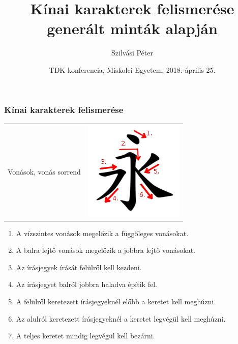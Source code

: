\documentclass{beamer}
\begin{document}

\title[Kínai karakterek felismerése
generált minták alapján]{
{\Large Kínai karakterek felismerése
generált minták alapján}
}
\author[Szilvási Péter]{\Large Szilvási Péter}
\date{TDK konferencia, Miskolci Egyetem, 2018. április 25.}

\frame{\titlepage}

\begin{frame}[fragile]
\frametitle{Kínai karakterek felismerése}

\begin{tabular}{c c}
{\large Vonások, vonás sorrend} & 
\includegraphics[scale=0.3, center]{vonasrend_ordered}
\end{tabular}

\begin{enumerate}
\item A vízszintes vonások megelőzik a függőleges vonásokat.
\item A balra lejtő vonások megelőzik a jobbra lejtő vonásokat.
\item Az írásjegyek írását felülről kell kezdeni.
\item Az írásjegyet balról jobbra haladva építik fel.
\item A felülről keretezett írásjegyeknél előbb a keretet kell meghúzni.
\item Az alulról keretezett írásjegyeknél a keretet legvégül kell meghúzni.
\item A teljes keretet mindig legvégül kell bezárni.
\end{enumerate}



\end{frame}
\end{document}
